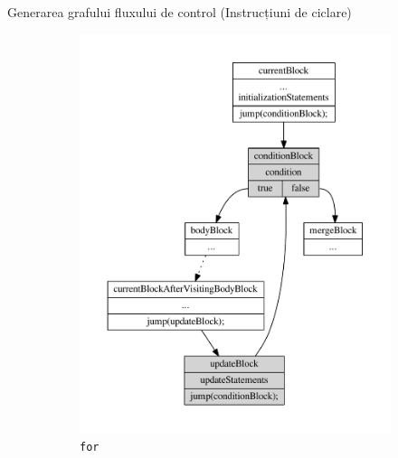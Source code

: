 \documentclass{beamer}
\def\code#1{\texttt{#1}}
\begin{document}
\begin{frame}{Generarea grafului fluxului de control (Instrucțiuni de ciclare)}
    \begin{figure}[htb]
        \begin{subfigure}[b]{0.32\textwidth}
            \centering
            \includegraphics[width=\textwidth]{../../../theses/diploma/src/graph/for.pdf}
            \caption{\code{for}}
        \end{subfigure}
        \hfill
        \begin{subfigure}[b]{0.32\textwidth}
            \centering

\end{subfigure}
\end{figure}
\end{frame}
\end{document}
